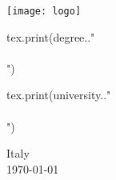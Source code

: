 \begin{titlepage}
\begin{center}
\vspace{1em}

\texttt{[image: logo]}

\vspace{1em}

\begin{luacode}
		tex.print(degree.."\\\\")
\end{luacode}
\begin{luacode}
		tex.print(university.."\\\\")
\end{luacode}
Italy \\
\today

\end{center}
\end{titlepage}